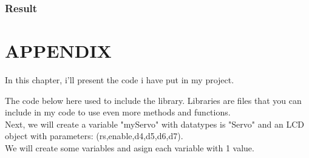 \documentclass[a4paper,13pt]{report}
\begin{document}
            \subsection{Result}

    \chapter{APPENDIX}
    \renewcommand{\headrulewidth}{0.5pt}
    \renewcommand{\footrulewidth}{0.5pt}
    \thispagestyle{fancy}
    \fancyhf{}
    \raggedright
        In this chapter, i'll present the code i have put in my project. \\
        \vspace{3mm}
        \par The code below here used to include the library. Libraries are files that you can 
        include in my code to use even more methods and functions. \\
        \vspace{2mm}
        \vspace{3mm}
        \linebreak
        Next, we will create a variable "myServo" with datatypes is "Servo" and an LCD object 
        with parameters: (rs,enable,d4,d5,d6,d7). \\
        \vspace{2mm}
        \vspace{3mm}
        \linebreak
        We will create some variables and asign each variable with 1 value. \\
        \vspace{2mm}
\end{document}
